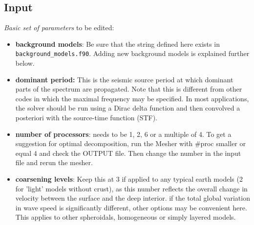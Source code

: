 \documentclass[11pt,letter,fleqn,english,notitlepage]{article}
\begin{document}
\subsection{Input}
\lstset{frame=single,basicstyle=\footnotesize, breaklines=true }


\noindent \textit{Basic set of parameters} to be edited:
\begin{itemize}
    \item \textbf{background models}: Be sure that the string defined here exists in 
    {\tt background\_models.f90}. Adding new background models is explained further below.
    
    \item \textbf{dominant period:} This is the seismic source period at which
    dominant parts of the spectrum are propagated. Note that this is different
    from other codes in which the maximal frequency may be specified.  In most
    applications, the solver should be run using a Dirac delta function and
    then convolved a posteriori with the source-time function (STF).
    
    \item \textbf{number of processors}: needs to be 1, 2, 6 or a multiple of
    4. To get a suggestion for optimal decomposition, run the Mesher with \#proc
    smaller or equal 4 and check the OUTPUT file. Then change the number in the
    input file and rerun the mesher.

    \item \textbf{coarsening levels}: Keep this at 3 if applied to any typical earth models
    (2 for 'light' models without crust), as this number reflects the overall
    change in velocity between the surface and the deep interior.  if the total
    global variation in wave speed is significantly different, other options
    may be convenient here. This applies to other spheroidals, homogeneous or
    simply layered models.
\end{itemize}
\end{document}
